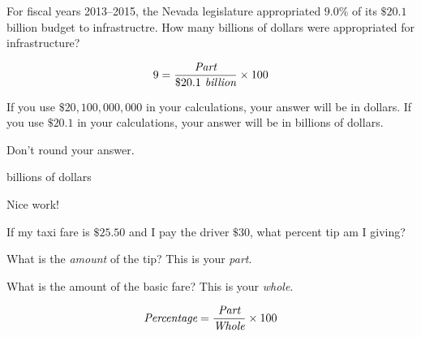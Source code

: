 \documentclass{ximera}
\begin{document}
\begin{question}
For fiscal years 2013--2015, the Nevada legislature appropriated $9.0\%$ of its $\$20.1$ billion budget to infrastructre. How many billions of dollars were appropriated for infrastructure? 	

\begin{solution}
\begin{hint}
\begin{equation*}9=\frac{\emph{\text{Part}}}{\$20.1\emph{\text{ billion}}}\times 100\end{equation*}
\end{hint}
\begin{hint}
If you use $\$20,100,000,000$ in your calculations, your answer will be in dollars. If you use $\$20.1$ in your calculations, your answer will be in billions of dollars.
\end{hint}
\begin{hint}
Don't round your answer.
\end{hint}
 billions of dollars

\begin{comment}
\begin{expression-answer}
function validator(p) {
    if (p - 1.809) &lt; 0.01)
      return 1;
    if (p - 1809000000 &lt; 10000000)
      return 1;
      return 0;
  }
\end{expression-answer}
\end{comment}
\end{solution}	

Nice work!
\end{question}

\begin{question}
If my taxi fare is $\$25.50$ and I pay the driver $\$30$, what percent tip am I giving?
  \begin{solution}
    \begin{multiple-choice}
    \end{multiple-choice}
    \begin{hint}
    What is the \emph{amount} of the tip? This is your \emph{part}.
    \end{hint}
    \begin{hint}
   What is the amount of the basic fare? This is your \emph{whole}.
    \end{hint}
  	\begin{hint}
    \begin{equation*}\emph{\text{Percentage}}=\frac{\emph{\text{Part}}}{\emph{\text{Whole}}}\times 100\end{equation*}
    \end{hint}
  \end{solution}
\end{question}
\end{document}
